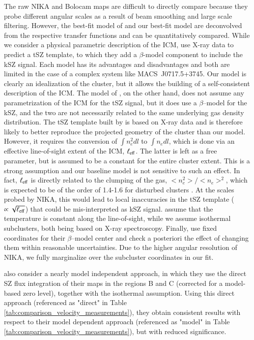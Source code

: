 \documentclass[twocolumn,traditabstract]{aa}
\begin{document}
The raw NIKA and Bolocam maps are difficult to directly compare because they probe different angular scales as a result of beam smoothing and large scale filtering. However, the best-fit model of \cite{Sayers2013} and our best-fit model are deconvolved from the respective transfer functions and can be quantitatively compared. While we consider a physical parametric description of the ICM, \cite{Sayers2013} use X-ray data to predict a tSZ template, to which they add a $\beta$-model component to include the kSZ signal. Each model has its advantages and disadvantages and both are limited in the case of a complex system like \mbox{MACS~J0717.5+3745}. Our model is clearly an idealization of the cluster, but it allows the building of a self-consistent description of the ICM. The model of \cite{Sayers2013}, on the other hand, does not assume any parametrization of the ICM for the tSZ signal, but it does use a $\beta$--model for the kSZ, and the two are not necessarily related to the same underlying gas density distribution. The tSZ template built by \cite{Sayers2013} is based on X-ray data and is therefore likely to better reproduce the projected geometry of the cluster than our model. However, it requires the conversion of $\int n_e^2 dl$ to $\int n_e dl$, which is done via an effective line-of-sight extent of the ICM, $\ell_{\rm eff}$. The latter is left as a free parameter, but is assumed to be a constant for the entire cluster extent. This is a strong assumption and our baseline model is not sensitive to such an effect. In fact, $\ell_{\rm eff}$ is directly related to the clumping of the gas, $< n_e^2> / <n_e>^2$, which is expected to be of the order of 1.4-1.6 for disturbed clusters \citep[e.g.,][]{Zhuravleva2013}. At the scales probed by NIKA, this would lead to local inaccuracies in the tSZ template ($\propto \sqrt{\ell_{\rm eff}}$) that could be mis-interpreted as kSZ signal. \cite{Sayers2013} assume that the temperature is constant along the line-of-sight, while we assume isothermal subclusters, both being based on X-ray spectroscopy. Finally, \cite{Sayers2013} use fixed coordinates for their $\beta$--model center and check a posteriori the effect of changing them within reasonable uncertainties. Due to the higher angular resolution of NIKA, we fully marginalize over the subcluster coordinates in our fit.

\cite{Sayers2013} also consider a nearly model independent approach, in which they use the direct SZ flux integration of their maps in the regions B and C (corrected for a model-based zero level), together with the isothermal assumption. Using this direct approach (referenced as "direct" in Table \ref{tab:comparison_velocity_measurements}), they obtain consistent results with respect to their model dependent approach (referenced as "model" in Table \ref{tab:comparison_velocity_measurements}), but with reduced significance.
\end{document}
